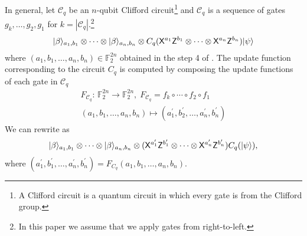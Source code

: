 \begin{definition}
In general, let $\mathcal{C}_q$ be an $n$-qubit Clifford circuit\footnote{A Clifford circuit is a quantum circuit in which every gate is from the Clifford group.} and $\mathcal{C}_q$ is a sequence of gates $g_k,\ldots,g_2,g_1$ for $k=|\mathcal{C}_q|.$\footnote{In this paper we assume that we apply gates from right-to-left.}
\begin{equation}
\label{relation:update}
\begin{aligned}
 {\lvert}\beta\rangle_{a_1,b_1}\otimes \cdots \otimes {\lvert}\beta\rangle_{a_n,b_n} \otimes C_q({\sf X}^{a_1}{\sf Z}^{b_1}\otimes \cdots \otimes{\sf X}^{a_n}{\sf Z}^{b_n}){\lvert}\psi\rangle
\end{aligned}
\end{equation}
where  $(a_1,b_1,\ldots,a_n,b_n)\in\mathbb{F}_2^{2n}$ obtained in the step 4 of .
The update function corresponding to the circuit $C_q$ is computed by composing the update functions of each gate in $\mathcal{C}_q$
\begin{equation*}
\begin{aligned}
F_{\mathcal{C}_q}:\, \mathbb{F}_2^{2n} \rightarrow  \mathbb{F}_2^{2n}, \; F_{\mathcal{C}_q}=f_k\circ\cdots \circ f_2 \circ f_1 \\(a_1,b_1,\dots, a_n,b_n)\mapsto (a_1^\prime,b_2^\prime,\dots, a_n^\prime,b_n^\prime)
 \end{aligned}
\end{equation*}
We can rewrite  as
\begin{equation*}
\begin{aligned}
{\lvert}\beta\rangle_{a_1,b_1}\otimes \cdots \otimes {\lvert}\beta\rangle_{a_n,b_n} \otimes ({\sf X}^{a_1^\prime}{\sf Z}^{b_1^\prime}\otimes \cdots \otimes{\sf X}^{a_n^\prime}{\sf Z}^{b_n^\prime})C_q({\lvert}\psi\rangle),
 \end{aligned}
\end{equation*}
where $(a_1^\prime,b_1^\prime,\dots, a_n^\prime,b_n^\prime)=F_{C_q}(a_1,b_1,\ldots,a_n,b_n).$ \\

%


\end{definition}
